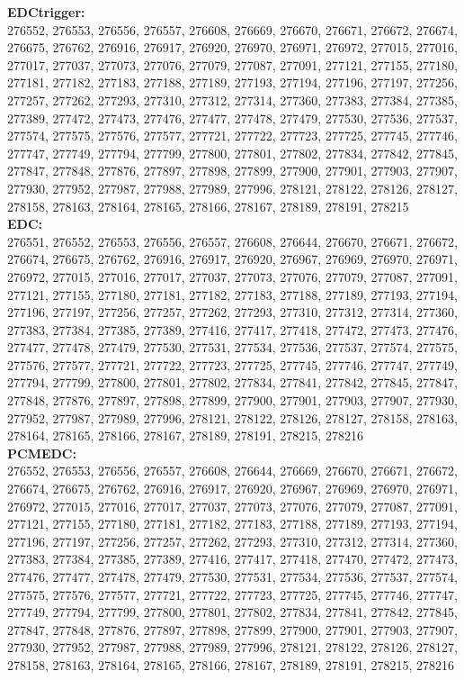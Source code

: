  \textbf{EDCtrigger:}\\
276552, 276553, 276556, 276557, 276608, 276669, 276670, 276671, 276672, 276674, 276675, 276762, 276916, 276917, 276920, 276970, 276971, 276972, 277015, 277016, 277017, 277037, 277073, 277076, 277079, 277087, 277091, 277121, 277155, 277180, 277181, 277182, 277183, 277188, 277189, 277193, 277194, 277196, 277197, 277256, 277257, 277262, 277293, 277310, 277312, 277314, 277360, 277383, 277384, 277385, 277389, 277472, 277473, 277476, 277477, 277478, 277479, 277530, 277536, 277537, 277574, 277575, 277576, 277577, 277721, 277722, 277723, 277725, 277745, 277746, 277747, 277749, 277794, 277799, 277800, 277801, 277802, 277834, 277842, 277845, 277847, 277848, 277876, 277897, 277898, 277899, 277900, 277901, 277903, 277907, 277930, 277952, 277987, 277988, 277989, 277996, 278121, 278122, 278126, 278127, 278158, 278163, 278164, 278165, 278166, 278167, 278189, 278191, 278215\\

 \textbf{EDC:}\\
276551, 276552, 276553, 276556, 276557, 276608, 276644, 276670, 276671, 276672, 276674, 276675, 276762, 276916, 276917, 276920, 276967, 276969, 276970, 276971, 276972, 277015, 277016, 277017, 277037, 277073, 277076, 277079, 277087, 277091, 277121, 277155, 277180, 277181, 277182, 277183, 277188, 277189, 277193, 277194, 277196, 277197, 277256, 277257, 277262, 277293, 277310, 277312, 277314, 277360, 277383, 277384, 277385, 277389, 277416, 277417, 277418, 277472, 277473, 277476, 277477, 277478, 277479, 277530, 277531, 277534, 277536, 277537, 277574, 277575, 277576, 277577, 277721, 277722, 277723, 277725, 277745, 277746, 277747, 277749, 277794, 277799, 277800, 277801, 277802, 277834, 277841, 277842, 277845, 277847, 277848, 277876, 277897, 277898, 277899, 277900, 277901, 277903, 277907, 277930, 277952, 277987, 277989, 277996, 278121, 278122, 278126, 278127, 278158, 278163, 278164, 278165, 278166, 278167, 278189, 278191, 278215, 278216\\

 \textbf{PCMEDC:}\\
276552, 276553, 276556, 276557, 276608, 276644, 276669, 276670, 276671, 276672, 276674, 276675, 276762, 276916, 276917, 276920, 276967, 276969, 276970, 276971, 276972, 277015, 277016, 277017, 277037, 277073, 277076, 277079, 277087, 277091, 277121, 277155, 277180, 277181, 277182, 277183, 277188, 277189, 277193, 277194, 277196, 277197, 277256, 277257, 277262, 277293, 277310, 277312, 277314, 277360, 277383, 277384, 277385, 277389, 277416, 277417, 277418, 277470, 277472, 277473, 277476, 277477, 277478, 277479, 277530, 277531, 277534, 277536, 277537, 277574, 277575, 277576, 277577, 277721, 277722, 277723, 277725, 277745, 277746, 277747, 277749, 277794, 277799, 277800, 277801, 277802, 277834, 277841, 277842, 277845, 277847, 277848, 277876, 277897, 277898, 277899, 277900, 277901, 277903, 277907, 277930, 277952, 277987, 277988, 277989, 277996, 278121, 278122, 278126, 278127, 278158, 278163, 278164, 278165, 278166, 278167, 278189, 278191, 278215, 278216\\

